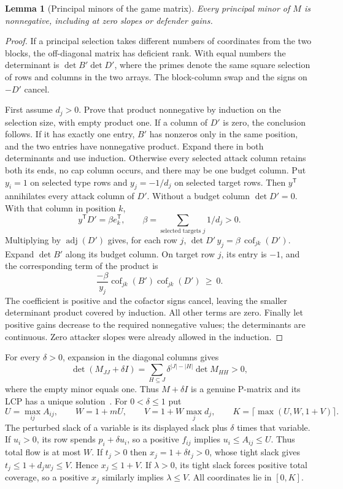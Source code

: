 \documentclass[11pt,oneside,openany,notitlepage]{report}
\newtheorem{lemma}[theorem]{Lemma}
\begin{document}
\begin{lemma}[Principal minors of the game matrix]\label{lem:game-minors}
Every principal minor of \(M\) is nonnegative, including at zero slopes
or defender gains.
\end{lemma}
\begin{proof}
If a principal selection takes different numbers of coordinates from
the two blocks, the off-diagonal matrix has deficient rank. With equal
numbers the determinant is \(\det B'\det D'\), where the primes denote
the same square selection of rows and columns in the two arrays. The
block-column swap and the signs on \(-D'\) cancel.

First assume \(d_j>0\). Prove that product nonnegative by induction
on the selection size, with empty product one. If a column of \(D'\)
is zero, the conclusion follows. If it has exactly one entry, \(B'\)
has nonzeros only in the same position, and the two entries have
nonnegative product. Expand there in both determinants and use induction.
Otherwise every selected attack column retains both its ends, no cap
column occurs, and there may be one budget column. Put \(y_i=1\) on
selected type rows and \(y_j=-1/d_j\) on selected target rows.
Then \(y^{\mathsf T}\) annihilates every attack column of \(D'\).
Without a budget column \(\det D'=0\). With that column in position \(k\),
\[
 y^{\mathsf T}D'=\beta e_k^{\mathsf T},
 \qquad \beta=\sum_{\text{selected targets }j}1/d_j>0 .
\]
Multiplying by \(\operatorname{adj}(D')\) gives, for each row \(j\),
\(\det D'\,y_j=\beta\,\operatorname{cof}_{jk}(D')\).
Expand \(\det B'\) along its budget column. On target row \(j\),
its entry is \(-1\), and the corresponding term of the product is
\[
 \frac{-\beta}{y_j}\operatorname{cof}_{jk}(B')\operatorname{cof}_{jk}(D')
 \ \ge\ 0 .
\]
The coefficient is positive and the cofactor signs cancel, leaving the
smaller determinant product covered by induction. All other terms are
zero. Finally let positive gains decrease to the required nonnegative
values; the determinants are continuous. Zero attacker slopes were
already allowed in the induction.
\end{proof}

For every \(\delta>0\), expansion in the diagonal columns gives
\[
 \det(M_{JJ}+\delta I)=\sum_{H\subseteq J}\delta^{|J|-|H|}\det M_{HH}>0 ,
\]
where the empty minor equals one.
Thus \(M+\delta I\) is a genuine P-matrix and its LCP has a unique
solution~\cite{book}. For \(0<\delta\le1\) put
\[
 U=\max_{ij}A_{ij},\qquad W=1+mU,\qquad V=1+W\max_j d_j,\qquad
 K=\lceil\max(U,W,1+V)\rceil.
\]
The perturbed slack of a variable is its displayed slack plus \(\delta\)
times that variable. If \(u_i>0\), its row spends \(p_i+\delta u_i\),
so a positive \(f_{ij}\) implies \(u_i\le A_{ij}\le U\). Thus total flow
is at most \(W\). If \(t_j>0\) then \(x_j=1+\delta t_j>0\), whose
tight slack gives \(t_j\le1+d_jw_j\le V\). Hence \(x_j\le1+V\).
If \(\lambda>0\), its tight slack forces positive total coverage, so
a positive \(x_j\) similarly implies \(\lambda\le V\). All coordinates
lie in \([0,K]\).
\end{document}
